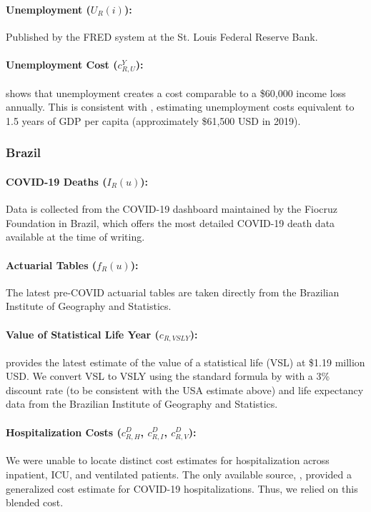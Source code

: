 \documentclass[msom,blindrev]{informs3} %
\begin{document}
\begin{APPENDICES}
\paragraph{Unemployment ($U_R(i)$):} Published by the FRED system at the St. Louis Federal Reserve Bank.

\paragraph{Unemployment Cost ($c^Y_{R,U}$):}  shows that unemployment creates a cost comparable to a \$60,000 income loss annually. This is consistent with , estimating unemployment costs equivalent to 1.5 years of GDP per capita (approximately \$61,500 USD in 2019).




\subsubsection{Brazil}
\paragraph{COVID-19 Deaths ($I_R(u)$):} Data is collected from the COVID-19 dashboard maintained by the Fiocruz Foundation in Brazil, which offers the most detailed COVID-19 death data available at the time of writing.
\paragraph{Actuarial Tables ($f_R(u)$):} The latest pre-COVID actuarial tables are taken directly from the Brazilian Institute of Geography and Statistics.
\paragraph{Value of Statistical Life Year ($c_{R,VSLY}$):}  provides the latest estimate of the value of a statistical life (VSL) at \$1.19 million USD. We convert VSL to VSLY using the standard formula by  with a 3\% discount rate (to be consistent with the USA estimate above) and life expectancy data from the Brazilian Institute of Geography and Statistics.
\paragraph{Hospitalization Costs ($c^D_{R,H}$, $c^D_{R,I}$, $c^D_{R,V}$):} We were unable to locate distinct cost estimates for hospitalization across inpatient, ICU, and ventilated patients. The only available source, , provided a generalized cost estimate for COVID-19 hospitalizations. Thus, we relied on this blended cost.

\end{APPENDICES}
\end{document}
